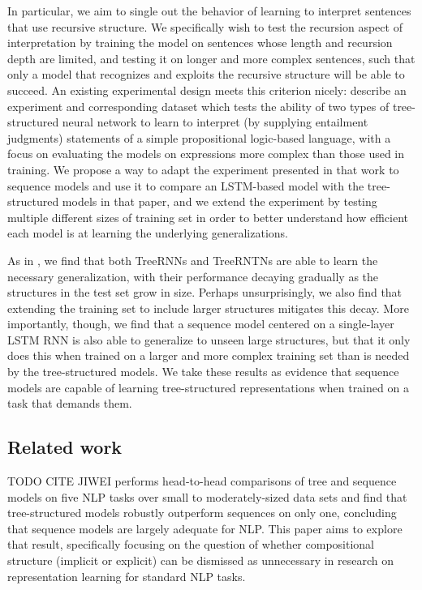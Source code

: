 In particular, we aim to single out the behavior of learning to interpret sentences that use recursive structure. We specifically wish to test the recursion aspect of interpretation by training the model on sentences whose length and recursion depth are limited, and testing it on longer and more complex sentences, such that only a model that recognizes and exploits the recursive structure will be able to succeed. An existing experimental design meets this criterion nicely:  describe an experiment and corresponding dataset which tests the ability of two types of tree-structured neural network to learn to interpret (by supplying entailment judgments) statements of a simple propositional logic-based language, with a focus on evaluating the models on expressions more complex than those used in training. We propose a way to adapt the experiment presented in that work to sequence models and use it to compare an LSTM-based model with the tree-structured models in that paper, and we extend the experiment by testing multiple different sizes of training set in order to better understand how efficient each model is at learning the underlying generalizations.

As in , we find that both TreeRNNs and TreeRNTNs are able to learn the necessary generalization, with their performance decaying gradually as the structures in the test set grow in size. Perhaps unsurprisingly, we also find that extending the training set to include larger structures mitigates this decay. More importantly, though, we find that a sequence model centered on a single-layer LSTM RNN is also able to generalize to unseen large structures, but that it only does this when trained on a larger and more complex training set than is needed by the tree-structured models. We take these results as evidence that sequence models are capable of learning tree-structured representations when trained on a task that demands them. 

\subsection{Related work}

TODO CITE JIWEI performs head-to-head comparisons of tree and sequence models on five NLP tasks over small to moderately-sized data sets and find that tree-structured models robustly outperform sequences on only one, concluding that sequence models are largely adequate for NLP. This paper aims to explore that result, specifically focusing on the question of whether compositional structure (implicit or explicit) can be dismissed as unnecessary in research on representation learning for standard NLP tasks.

